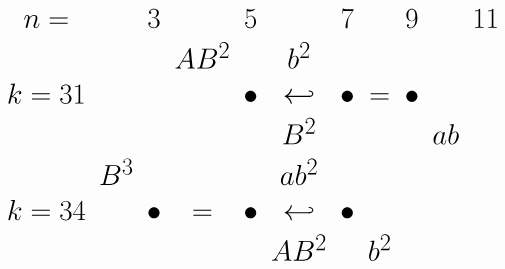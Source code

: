 \documentclass{article}
\begin{document}
\(
\begin{tikzcd}[nodes={font=\Huge},row sep=0.2cm,column sep=0.1cm]
n= & & 3 & & 5 & & 7 & & 9 & & 11 \\
 & & & AB^2 & & b^2 \\
k=31 & & & & \bullet & \hookleftarrow & \bullet & = & \bullet \\
& & & & & B^2 & & & & ab \\
& B^3 & & & & ab^2 \\
k=34 & & \bullet & = & \bullet & \hookleftarrow & \bullet \\
 & & & & & AB^2 & & b^2 
\end{tikzcd}
\)
\end{document}
